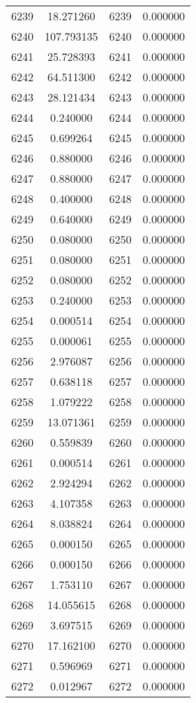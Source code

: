 \documentclass[12pt]{article}
\begin{document}
\begin{longtable}{@{}cccc@{}}
6239 & 18.271260 & 6239 & 0.000000 \\
6240 & 107.793135 & 6240 & 0.000000 \\
6241 & 25.728393 & 6241 & 0.000000 \\
6242 & 64.511300 & 6242 & 0.000000 \\
6243 & 28.121434 & 6243 & 0.000000 \\
6244 & 0.240000 & 6244 & 0.000000 \\
6245 & 0.699264 & 6245 & 0.000000 \\
6246 & 0.880000 & 6246 & 0.000000 \\
6247 & 0.880000 & 6247 & 0.000000 \\
6248 & 0.400000 & 6248 & 0.000000 \\
6249 & 0.640000 & 6249 & 0.000000 \\
6250 & 0.080000 & 6250 & 0.000000 \\
6251 & 0.080000 & 6251 & 0.000000 \\
6252 & 0.080000 & 6252 & 0.000000 \\
6253 & 0.240000 & 6253 & 0.000000 \\
6254 & 0.000514 & 6254 & 0.000000 \\
6255 & 0.000061 & 6255 & 0.000000 \\
6256 & 2.976087 & 6256 & 0.000000 \\
6257 & 0.638118 & 6257 & 0.000000 \\
6258 & 1.079222 & 6258 & 0.000000 \\
6259 & 13.071361 & 6259 & 0.000000 \\
6260 & 0.559839 & 6260 & 0.000000 \\
6261 & 0.000514 & 6261 & 0.000000 \\
6262 & 2.924294 & 6262 & 0.000000 \\
6263 & 4.107358 & 6263 & 0.000000 \\
6264 & 8.038824 & 6264 & 0.000000 \\
6265 & 0.000150 & 6265 & 0.000000 \\
6266 & 0.000150 & 6266 & 0.000000 \\
6267 & 1.753110 & 6267 & 0.000000 \\
6268 & 14.055615 & 6268 & 0.000000 \\
6269 & 3.697515 & 6269 & 0.000000 \\
6270 & 17.162100 & 6270 & 0.000000 \\
6271 & 0.596969 & 6271 & 0.000000 \\
6272 & 0.012967 & 6272 & 0.000000 \\

\end{longtable}
\end{document}
